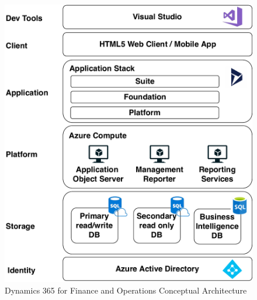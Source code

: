 \begin{figure}[ht]
	\centering
	\includegraphics[scale=0.53]{Images/D365Architecture.pdf}
	\caption{Dynamics 365 for Finance and Operations Conceptual Architecture}
	\label{fig:D365Architecture}
\end{figure}

